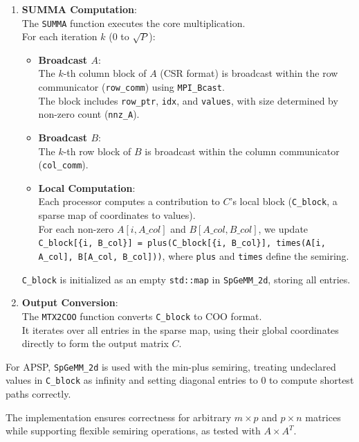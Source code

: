 \documentclass[11pt]{article}
\begin{document}
\begin{enumerate}
    \item \textbf{SUMMA Computation}:\\
        The \texttt{SUMMA} function executes the core multiplication.\\
        For each iteration $k$ (0 to $\sqrt{P}$):
    \begin{itemize}[topsep=0pt, itemsep=0pt]
        \item \textbf{Broadcast $A$}:\\ 
            The $k$-th column block of $A$ (CSR format) is broadcast within the row communicator (\texttt{row\_comm}) using \texttt{MPI\_Bcast}.\\
            The block includes \texttt{row\_ptr}, \texttt{idx}, and \texttt{values}, with size determined by non-zero count (\texttt{nnz\_A}).
        \item \textbf{Broadcast $B$}:\\
            The $k$-th row block of $B$ is broadcast within the column communicator (\texttt{col\_comm}).
        \item \textbf{Local Computation}:\\
            Each processor computes a contribution to $C$’s local block (\texttt{C\_block}, a sparse map of coordinates to values).\\
            For each non-zero $A[i, A\_col]$ and $B[A\_col, B\_col]$, we update \texttt{C\_block[\{i, B\_col\}] = plus(C\_block[\{i, B\_col\}], times(A[i, A\_col], B[A\_col, B\_col]))}, where \texttt{plus} and \texttt{times} define the semiring.
    \end{itemize}
    \texttt{C\_block} is initialized as an empty \texttt{std::map} in \texttt{SpGeMM\_2d}, storing {\color{black} all entries}.

    \item \textbf{Output Conversion}:\\
        The \texttt{MTX2COO} function converts \texttt{C\_block} to COO format.\\
        {\color{black}It iterates over all entries in the sparse map, using their global coordinates directly to form the output matrix $C$.}
\end{enumerate}

{\color{black}For APSP, \texttt{SpGeMM\_2d} is used with the min-plus semiring, treating undeclared values in \texttt{C\_block} as infinity and setting diagonal entries to 0 to compute shortest paths correctly.}

The implementation ensures correctness for arbitrary $m \times p$ and $p \times n$ matrices while supporting flexible semiring operations, as tested with $A \times A^T$.
\end{document}
